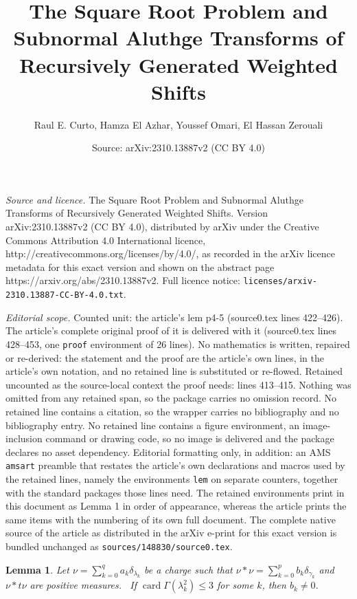 \documentclass[10pt,a4paper]{amsart}
\title{The Square Root Problem and Subnormal Aluthge Transforms of Recursively Generated Weighted Shifts}
\author{Raul E. Curto, Hamza El Azhar, Youssef Omari, El Hassan Zerouali}
\date{Source: arXiv:2310.13887v2 (CC BY 4.0)}
\newtheorem{lem}{Lemma}
\newcommand{\card}{\operatorname{card}}
\begin{document}
\maketitle

\noindent\emph{Source and licence.} The Square Root Problem and Subnormal Aluthge Transforms of Recursively Generated Weighted Shifts. Version arXiv:2310.13887v2 (CC BY 4.0), distributed by arXiv under the Creative Commons Attribution 4.0 International licence, http://creativecommons.org/licenses/by/4.0/, as recorded in the arXiv licence metadata for this exact version and shown on the abstract page https://arxiv.org/abs/2310.13887v2. Full licence notice: \texttt{licenses/arxiv-2310.13887-CC-BY-4.0.txt}.\par\smallskip

\noindent\textit{Editorial scope.} Counted unit: the article's lem p4-5 (source0.tex lines 422--426). The article's complete original proof of it is delivered with it (source0.tex lines 428--453, one \texttt{proof} environment of 26 lines). No mathematics is written, repaired or re-derived: the statement and the proof are the article's own lines, in the article's own notation, and no retained line is substituted or re-flowed.  Retained uncounted as the source-local context the proof needs: lines 413--415.  Nothing was omitted from any retained span, so the package carries no omission record.  No retained line contains a citation, so the wrapper carries no bibliography and no bibliography entry.  No retained line contains a figure environment, an image-inclusion command or drawing code, so no image is delivered and the package declares no asset dependency.  Editorial formatting only, in addition: an AMS \texttt{amsart} preamble that restates the article's own declarations and macros used by the retained lines, namely the environments \texttt{lem} on separate counters, together with the standard packages those lines need.  The retained environments print in this document as Lemma 1 in order of appearance, whereas the article prints the same items with the numbering of its own full document.  The complete native source of the article as distributed in the arXiv e-print for this exact version is bundled unchanged as \texttt{sources/148830/source0.tex}.
\begin{lem}\label{card3}
    Let $\nu=\sum_{k=0}^q a_k\delta_{\lambda_k}$ be a charge such that $\nu*\nu=\sum_{k=0}^p b_k \delta_{\gamma_k}$ and $\nu*t\nu$ are positive measures. \ If  $\card\Gamma(\lambda^2_k)\leq 3$ for some  $k$, then  $b_k\ne0$.
\end{lem}
\end{document}
